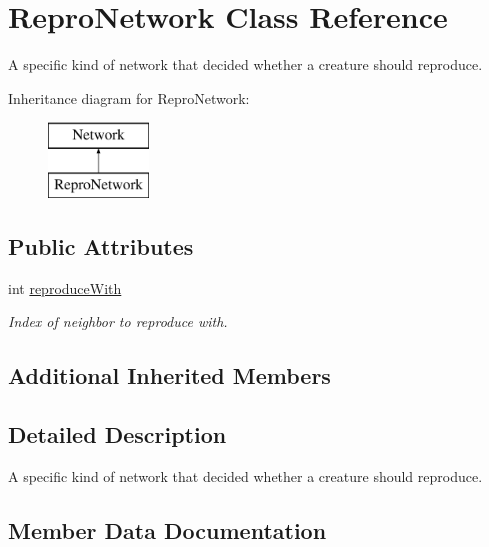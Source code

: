 \hypertarget{class_repro_network}{}\section{Repro\+Network Class Reference}
\label{class_repro_network}


A specific kind of network that decided whether a creature should reproduce.  


Inheritance diagram for Repro\+Network\+:\begin{figure}[H]
\begin{center}
\leavevmode
\includegraphics[height=2.000000cm]{class_repro_network}
\end{center}
\end{figure}
\subsection*{Public Attributes}
\begin{DoxyCompactItemize}
\item 
int \mbox{\hyperlink{class_repro_network_a2e648d1a88c94f1008a21c7c0d0b122b}{reproduce\+With}}
\begin{DoxyCompactList}\small\item\em Index of neighbor to reproduce with. \end{DoxyCompactList}\end{DoxyCompactItemize}
\subsection*{Additional Inherited Members}


\subsection{Detailed Description}
A specific kind of network that decided whether a creature should reproduce. 



\subsection{Member Data Documentation}
\mbox{\label{class_repro_network_a2e648d1a88c94f1008a21c7c0d0b122b}} 
